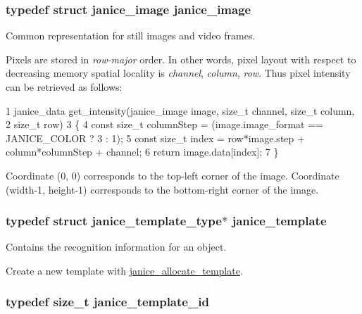\subsubsection[{janice\+\_\+image}]{\setlength{\rightskip}{0pt plus 5cm}typedef struct {\bf janice\+\_\+image}  {\bf janice\+\_\+image}}\label{group__janice_ga3f20c208762563c88c414664c21d654e}


Common representation for still images and video frames. 

Pixels are stored in {\itshape row-\/major} order. In other words, pixel layout with respect to decreasing memory spatial locality is {\itshape channel}, {\itshape column}, {\itshape row}. Thus pixel intensity can be retrieved as follows\+:


\begin{DoxyCode}
1 janice\_data get\_intensity(janice\_image image, size\_t channel, size\_t column,
2                                                                      size\_t row)
3 \{
4     const size\_t columnStep = (image.image\_format == JANICE\_COLOR ? 3 : 1);
5     const size\_t index = row*image.step + column*columnStep + channel;
6     return image.data[index];
7 \}
\end{DoxyCode}


Coordinate (0, 0) corresponds to the top-\/left corner of the image. Coordinate (width-\/1, height-\/1) corresponds to the bottom-\/right corner of the image. \hypertarget{group__janice_ga5593b06e86b90504968c0fc191ee2f3c}{}
\subsubsection[{janice\+\_\+template}]{\setlength{\rightskip}{0pt plus 5cm}typedef struct janice\+\_\+template\+\_\+type$\ast$ {\bf janice\+\_\+template}}\label{group__janice_ga5593b06e86b90504968c0fc191ee2f3c}


Contains the recognition information for an object. 

Create a new template with \hyperlink{group__janice_ga5709bc7f0fd329db20f72cac8639c328}{janice\+\_\+allocate\+\_\+template}. \hypertarget{group__janice_ga5ec62465fbbc7a92faadfefd3d20e25b}{}
\subsubsection[{janice\+\_\+template\+\_\+id}]{\setlength{\rightskip}{0pt plus 5cm}typedef size\+\_\+t {\bf janice\+\_\+template\+\_\+id}}\label{group__janice_ga5ec62465fbbc7a92faadfefd3d20e25b}


